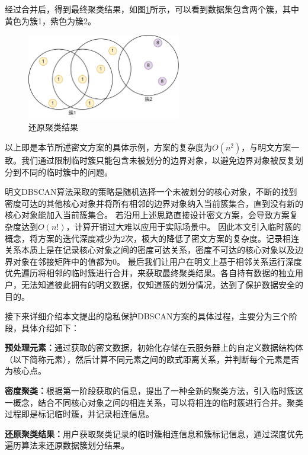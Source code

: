 经过合并后，得到最终聚类结果，如图\ref{dbres}所示，可以看到数据集包含两个簇，其中黄色为簇1，紫色为簇2。
\begin{figure}[htbp]
	\centering
	\includegraphics[width=0.6\textwidth]{img/dbres.png}
	\caption{还原聚类结果}
	\label{dbres}
\end{figure}

以上即是本节所述密文方案的具体示例，方案的复杂度为$ O(n^2) $，与明文方案一致。我们通过限制临时簇只能包含未被划分的边界对象，以避免边界对象被反复划分到不同的临时簇中的问题。

明文DBSCAN算法采取的策略是随机选择一个未被划分的核心对象，不断的找到密度可达的其他核心对象并将所有相邻的边界对象纳入当前簇集合，直到没有新的核心对象能加入当前簇集合。
若沿用上述思路直接设计密文方案，会导致方案复杂度达到$ O(n!) $，计算开销过大难以应用于实际场景中。
因此本文引入临时簇的概念，将方案的迭代深度减少为2次，极大的降低了密文方案的复杂度。记录相连关系本质上是在记录核心对象之间的密度可达关系，密度不可达的核心对象以及边界对象在邻接矩阵中的值都为0。
最后我们让用户在明文上基于相邻关系运行深度优先遍历将相邻的临时簇进行合并，来获取最终聚类结果。各自持有数据的独立用户，无法知道彼此拥有的明文数据，仅知道簇的划分情况，达到了保护数据安全的目的。

接下来详细介绍本文提出的隐私保护DBSCAN方案的具体过程，主要分为三个阶段，具体介绍如下：
\begin{compactitem}
	\item \textbf{预处理元素：}通过获取的密文数据，初始化存储在云服务器上的自定义数据结构体（以下简称元素），然后计算不同元素之间的欧式距离关系，并判断每个元素是否为核心点。
	\item \textbf{密度聚类：}根据第一阶段获取的信息，提出了一种全新的聚类方法，引入临时簇这一概念，结合不同核心对象之间的相连关系，可以将相连的临时簇进行合并。聚类过程即是标记临时簇，并记录相连信息。
	\item \textbf{还原聚类结果：}用户获取聚类记录的临时簇相连信息和簇标记信息，通过深度优先遍历算法来还原数据簇划分结果。
\end{compactitem}


